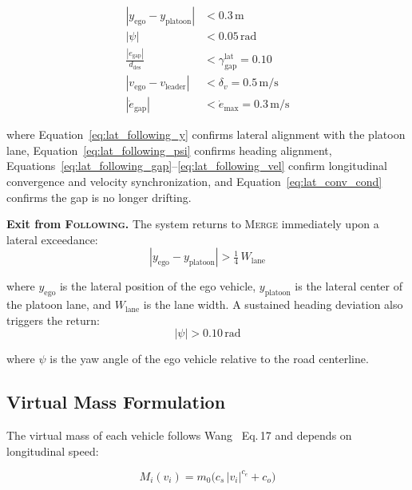 \documentclass[12pt,a4paper,oneside]{report}
\begin{document}
\begin{align}
|y_{\mathrm{ego}} - y_{\mathrm{platoon}}| &< 0.3\,\mathrm{m} \label{eq:lat_following_y} \\
|\psi| &< 0.05\,\mathrm{rad} \label{eq:lat_following_psi} \\
\frac{|e_{\mathrm{gap}}|}{d_{\mathrm{des}}} &< \gamma_{\mathrm{gap}}^{\mathrm{lat}} = 0.10 \label{eq:lat_following_gap} \\
|v_{\mathrm{ego}} - v_{\mathrm{leader}}| &< \delta_v = 0.5\,\mathrm{m/s} \label{eq:lat_following_vel} \\
\left|\dot{e}_{\mathrm{gap}}\right| &< \dot{e}_{\mathrm{max}} = 0.3\,\mathrm{m/s} \label{eq:lat_conv_cond}
\end{align}

where Equation~\ref{eq:lat_following_y} confirms lateral alignment with the platoon lane, Equation~\ref{eq:lat_following_psi} confirms heading alignment, Equations~\ref{eq:lat_following_gap}--\ref{eq:lat_following_vel} confirm longitudinal convergence and velocity synchronization, and Equation~\ref{eq:lat_conv_cond} confirms the gap is no longer drifting.

\textbf{Exit from \textsc{Following}.} The system returns to \textsc{Merge} immediately upon a lateral exceedance:
\begin{equation}
|y_{\mathrm{ego}} - y_{\mathrm{platoon}}| > \tfrac{1}{4}\,W_{\mathrm{lane}}
\label{eq:lat_exit_y}
\end{equation}

where $y_{\mathrm{ego}}$ is the lateral position of the ego vehicle, $y_{\mathrm{platoon}}$ is the lateral center of the platoon lane, and $W_{\mathrm{lane}}$ is the lane width. A sustained heading deviation also triggers the return:
\begin{equation}
|\psi| > 0.10\,\mathrm{rad}
\label{eq:lat_exit_psi}
\end{equation}

where $\psi$ is the yaw angle of the ego vehicle relative to the road centerline.

\subsection{Virtual Mass Formulation}
\label{sec:lat_virtual_mass}

The virtual mass of each vehicle follows Wang~\cite{wangDrivingSafetyField2016} Eq.\,17 and depends on longitudinal speed:

\begin{equation}
M_i(v_i) = m_0 \bigl(c_s\,|v_i|^{c_e} + c_o\bigr)
\label{eq:lat_virtual_mass}
\end{equation}
\end{document}
